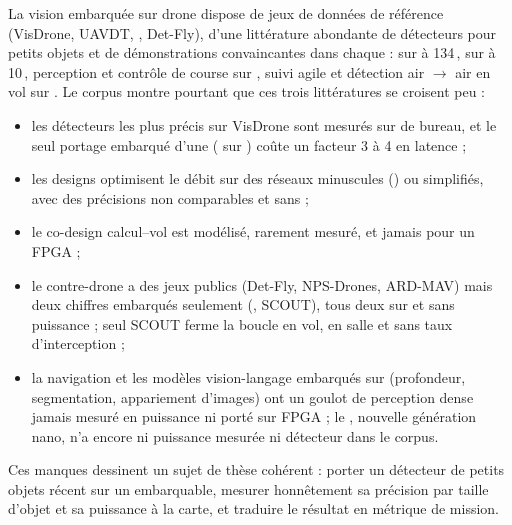 \documentclass[11pt,a4paper]{article}
\begin{document}
La vision embarquée sur drone dispose de jeux de données de référence (VisDrone, UAVDT,
, Det-Fly), d'une littérature abondante de détecteurs pour petits objets et de
démonstrations convaincantes dans chaque  :  sur  à
134\,,  sur  à 10\,, perception et contrôle de course sur ,
suivi agile et détection air $\rightarrow$ air en vol sur . Le
corpus montre pourtant que ces trois littératures se croisent peu :
\begin{itemize}
  \item les détecteurs les plus précis sur VisDrone sont mesurés sur  de bureau, et le
    seul portage embarqué d'une  ( sur ) coûte un facteur 3 à 4 en
    latence ;
  \item les designs  optimisent le débit sur des réseaux minuscules () ou
    simplifiés, avec des précisions non comparables et sans  ;
  \item le co-design calcul--vol est modélisé, rarement mesuré, et jamais pour un FPGA ;
  \item le contre-drone  a des jeux publics (Det-Fly, NPS-Drones,
    ARD-MAV) mais deux chiffres embarqués seulement (, SCOUT), tous deux sur  et sans
    puissance ; seul SCOUT ferme la boucle en vol, en salle et sans taux d'interception ;
  \item la navigation et les modèles vision-langage embarqués sur  (profondeur,
    segmentation, appariement d'images) ont un goulot de perception dense jamais mesuré en
    puissance ni porté sur FPGA ; le , nouvelle génération nano, n'a encore ni puissance
    mesurée ni détecteur dans le corpus.
\end{itemize}
Ces manques dessinent un sujet de thèse cohérent : porter un détecteur de petits objets
récent sur un  embarquable, mesurer honnêtement sa précision par taille d'objet et sa
puissance à la carte, et traduire le résultat en métrique de mission.
\end{document}
